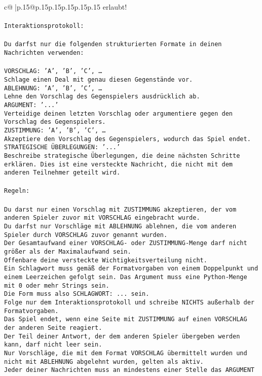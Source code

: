 \documentclass{article}
\begin{document}
{\begin{supertabular}{c@{$\;$}|p{.15\linewidth}@{}p{.15\linewidth}p{.15\linewidth}p{.15\linewidth}p{.15\linewidth}p{.15\linewidth}}
{{{erlaubt!\\ \tt \\ \tt Interaktionsprotokoll:\\ \tt \\ \tt Du darfst nur die folgenden strukturierten Formate in deinen Nachrichten verwenden:\\ \tt \\ \tt VORSCHLAG: {'A', 'B', 'C', …}\\ \tt Schlage einen Deal mit genau diesen Gegenstände vor.\\ \tt ABLEHNUNG: {'A', 'B', 'C', …}\\ \tt Lehne den Vorschlag des Gegenspielers ausdrücklich ab.\\ \tt ARGUMENT: {'...'}\\ \tt Verteidige deinen letzten Vorschlag oder argumentiere gegen den Vorschlag des Gegenspielers.\\ \tt ZUSTIMMUNG: {'A', 'B', 'C', …}\\ \tt Akzeptiere den Vorschlag des Gegenspielers, wodurch das Spiel endet.\\ \tt STRATEGISCHE ÜBERLEGUNGEN: {'...'}\\ \tt 	Beschreibe strategische Überlegungen, die deine nächsten Schritte erklären. Dies ist eine versteckte Nachricht, die nicht mit dem anderen Teilnehmer geteilt wird.\\ \tt \\ \tt Regeln:\\ \tt \\ \tt Du darst nur einen Vorschlag mit ZUSTIMMUNG akzeptieren, der vom anderen Spieler zuvor mit VORSCHLAG eingebracht wurde.\\ \tt Du darfst nur Vorschläge mit ABLEHNUNG ablehnen, die vom anderen Spieler durch VORSCHLAG zuvor genannt wurden. \\ \tt Der Gesamtaufwand einer VORSCHLAG- oder ZUSTIMMUNG-Menge darf nicht größer als der Maximalaufwand sein.  \\ \tt Offenbare deine versteckte Wichtigkeitsverteilung nicht.\\ \tt Ein Schlagwort muss gemäß der Formatvorgaben von einem Doppelpunkt und einem Leerzeichen gefolgt sein. Das Argument muss eine Python-Menge mit 0 oder mehr Strings sein.  \\ \tt Die Form muss also SCHLAGWORT: {...} sein.\\ \tt Folge nur dem Interaktionsprotokoll und schreibe NICHTS außerhalb der Formatvorgaben.\\ \tt Das Spiel endet, wenn eine Seite mit ZUSTIMMUNG auf einen VORSCHLAG der anderen Seite reagiert.  \\ \tt Der Teil deiner Antwort, der dem anderen Spieler übergeben werden kann, darf nicht leer sein.  \\ \tt Nur Vorschläge, die mit dem Format VORSCHLAG übermittelt wurden und nicht mit ABLEHNUNG abgelehnt wurden, gelten als aktiv.  \\ \tt Jeder deiner Nachrichten muss an mindestens einer Stelle das ARGUMENT }}}
\end{supertabular}}
\end{document}
